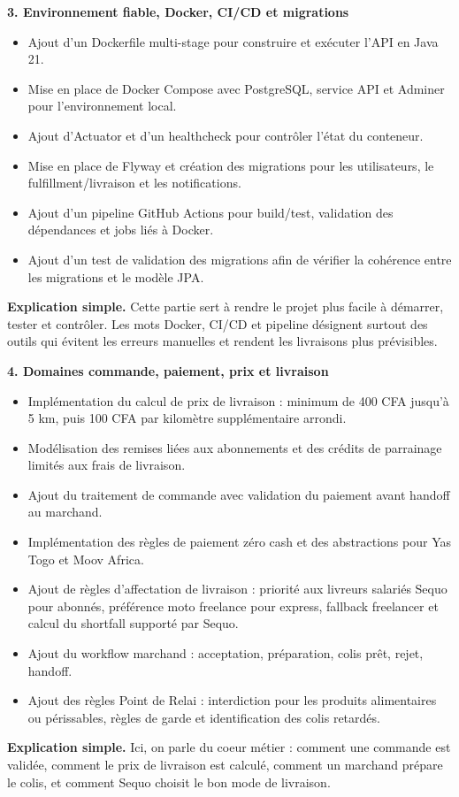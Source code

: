 \documentclass[11pt,letterpaper]{article}
\newcommand{\subsectiontitle}[1]{%
  \vspace{0.35em}
  {\large\bfseries\color{SequoInk}#1}\par
}
\newcommand{\simpleexplanation}[1]{%
  {\small\textbf{\color{SequoBlue}Explication simple.} \color{SequoMuted}#1\par}
}
\begin{document}
\subsectiontitle{3. Environnement fiable, Docker, CI/CD et migrations}
\begin{itemize}
  \item Ajout d'un Dockerfile multi-stage pour construire et exécuter l'API en Java 21.
  \item Mise en place de Docker Compose avec PostgreSQL, service API et Adminer pour l'environnement local.
  \item Ajout d'Actuator et d'un healthcheck pour contrôler l'état du conteneur.
  \item Mise en place de Flyway et création des migrations pour les utilisateurs, le fulfillment/livraison et les notifications.
  \item Ajout d'un pipeline GitHub Actions pour build/test, validation des dépendances et jobs liés à Docker.
  \item Ajout d'un test de validation des migrations afin de vérifier la cohérence entre les migrations et le modèle JPA.
\end{itemize}
\simpleexplanation{Cette partie sert à rendre le projet plus facile à démarrer, tester et contrôler. Les mots Docker, CI/CD et pipeline désignent surtout des outils qui évitent les erreurs manuelles et rendent les livraisons plus prévisibles.}

\subsectiontitle{4. Domaines commande, paiement, prix et livraison}
\begin{itemize}
  \item Implémentation du calcul de prix de livraison : minimum de 400 CFA jusqu'à 5 km, puis 100 CFA par kilomètre supplémentaire arrondi.
  \item Modélisation des remises liées aux abonnements et des crédits de parrainage limités aux frais de livraison.
  \item Ajout du traitement de commande avec validation du paiement avant handoff au marchand.
  \item Implémentation des règles de paiement zéro cash et des abstractions pour Yas Togo et Moov Africa.
  \item Ajout de règles d'affectation de livraison : priorité aux livreurs salariés Sequo pour abonnés, préférence moto freelance pour express, fallback freelancer et calcul du shortfall supporté par Sequo.
  \item Ajout du workflow marchand : acceptation, préparation, colis prêt, rejet, handoff.
  \item Ajout des règles Point de Relai : interdiction pour les produits alimentaires ou périssables, règles de garde et identification des colis retardés.
\end{itemize}
\simpleexplanation{Ici, on parle du coeur métier : comment une commande est validée, comment le prix de livraison est calculé, comment un marchand prépare le colis, et comment Sequo choisit le bon mode de livraison.}
\end{document}
